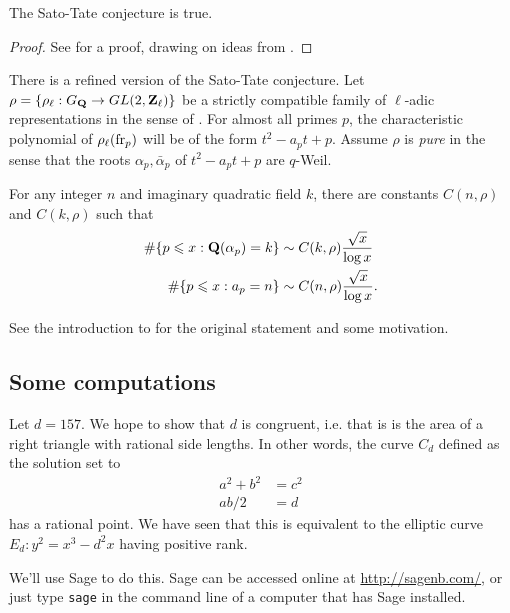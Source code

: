 \begin{theorem}
The Sato-Tate conjecture is true. 
\end{theorem}
\begin{proof}
See \cite{t08} for a proof, drawing on ideas from \cite{bght11}. 
\end{proof}

There is a refined version of the Sato-Tate conjecture. Let 
$\rho=\{\rho_\ell:G_{\mathbf{Q}} \to GL(2,\mathbf{Z}_\ell)\}$ be a strictly compatible family 
of $\ell$-adic representations in the sense of \cite[ch.1]{se68}. For almost 
all primes $p$, the characteristic polynomial of $\rho_\ell(\mathrm{fr}_p)$ will be 
of the form $t^2 - a_p t + p$. Assume $\rho$ is \emph{pure} in the sense that 
the roots $\alpha_p,\bar\alpha_p$ of $t^2-a_p t+p$ are $q$-Weil. 

\begin{conjecture}
For any integer $n$ and imaginary quadratic field $k$, there are constants 
$C(n,\rho)$ and $C(k,\rho)$ such that 
\begin{align*}
  \#\{ p\leqslant x : \mathbf{Q}(\alpha_p) = k\} &\sim C(k,\rho) \frac{\sqrt x}{\log x} \\
  \#\{p\leqslant x : a_p = n\} &\sim C(n,\rho) \frac{\sqrt x}{\log x} \text{.}
\end{align*}
\end{conjecture}

See the introduction to \cite{lt76} for the original statement and some 
motivation. 





\subsection{Some computations}

Let $d=157$. We hope to show that $d$ is congruent, i.e. that is is the area 
of a right triangle with rational side lengths. In other words, the curve 
$C_d$ defined as the solution set to 
\begin{align*}
  a^2+b^2 &= c^2 \\
  a b/2 &= d
\end{align*}
has a rational point. We have seen that this is equivalent to the elliptic 
curve $E_d:y^2=x^3-d^2 x$ having positive rank. 

We'll use Sage to do this. Sage can be accessed online at 
\url{http://sagenb.com/}, or just type \texttt{sage} in the command line of a 
computer that has Sage installed. 


